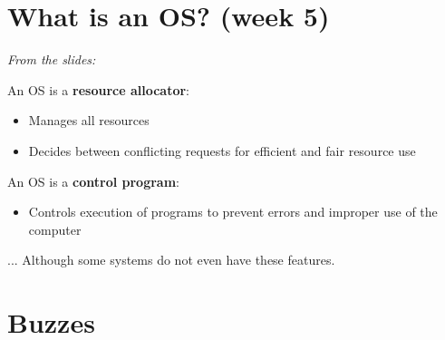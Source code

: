 \documentclass{article}
\begin{document}
\section*{What is an OS? (week 5)}
\emph{From the slides:}

An OS is a \textbf{resource allocator}:
\begin{itemize}
	\item Manages all resources
	\item Decides between conflicting requests for efficient and fair resource use
\end{itemize}

An OS is a \textbf{control program}:
\begin{itemize}
	\item Controls execution of programs to prevent errors and improper use of the computer
\end{itemize}

... Although some systems do not even have these features.


\section{Buzzes}

\end{document}
